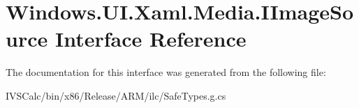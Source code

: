 \hypertarget{interface_windows_1_1_u_i_1_1_xaml_1_1_media_1_1_i_image_source}{}\section{Windows.\+U\+I.\+Xaml.\+Media.\+I\+Image\+Source Interface Reference}
\label{interface_windows_1_1_u_i_1_1_xaml_1_1_media_1_1_i_image_source}


The documentation for this interface was generated from the following file\+:\begin{DoxyCompactItemize}
\item 
I\+V\+S\+Calc/bin/x86/\+Release/\+A\+R\+M/ilc/Safe\+Types.\+g.\+cs\end{DoxyCompactItemize}

